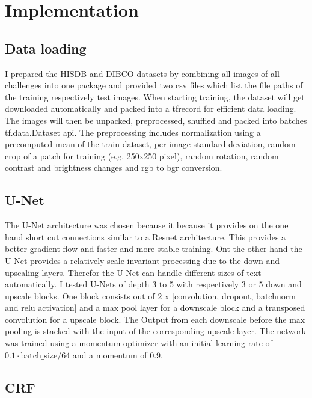 \documentclass[a4paper, 9pt, twocolumn]{extarticle}
\begin{document}

\section{Implementation}
\label{section:implementation}

\subsection*{Data loading}

I prepared the HISDB and DIBCO datasets by combining all images of all
challenges into one package and provided two csv files which list the file paths
of the training respectively test images. When starting training, the dataset
will get downloaded automatically and packed into a tfrecord for efficient data
loading. The images will then be unpacked, preprocessed, shuffled and packed
into batches tf.data.Dataset api. The preprocessing includes normalization using
a precomputed mean of the train dataset, per image standard deviation, random
crop of a patch for training (e.g. 250x250 pixel), random rotation, random
contrast and brightness changes and rgb to bgr conversion.

\subsection*{U-Net}

The U-Net architecture was chosen because it because it provides on the one hand
short cut connections similar to a Resnet architecture. This provides a better
gradient flow and faster and more stable training. Ont the other hand the U-Net
provides a relatively scale invariant processing due to the down and upscaling
layers. Therefor the U-Net can handle different sizes of text automatically. I
tested U-Nets of depth 3 to 5 with respectively 3 or 5 down and upscale blocks.
One block consists out of 2 x [convolution, dropout, batchnorm and relu
activation] and a max pool layer for a downscale block and a transposed
convolution for a upscale block. The Output from each downscale before the max
pooling is stacked with the input of the corresponding upscale layer. The
network was trained using a momentum optimizer with an initial learning rate of
$0.1\cdot \text{batch\_size} / 64$ and a momentum of 0.9.

\subsection*{CRF}
\end{document}
